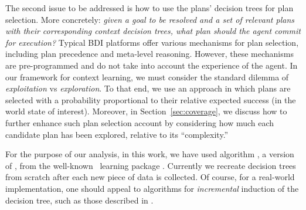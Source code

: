 The second issue to be addressed is how to use the plans' decision trees for plan
selection. More concretely: \emph{given a goal to be resolved and a set of
relevant plans with their corresponding context decision trees, what plan should
the agent commit for execution?}
Typical BDI platforms offer various mechanisms for plan selection, including plan
precedence and meta-level reasoning. However, these mechanisms are pre-programmed
and do not take into account the experience of the agent.
In our framework for context learning, we must consider the standard dilemma of
\emph{exploitation} vs \emph{exploration}. To that end, we use an 
approach in which plans are selected with a probability proportional to their relative expected
success (in the world state of interest). Moreover, in
Section~\ref{sec:coverage}, we discuss how to further enhance such plan selection
account by considering how much each candidate plan has been
explored, relative to its ``complexity.''



For the purpose of our analysis, in this work, we have used algorithm
, a version of  \cite{Mitchell97:ML}, from the
well-known \weka\ learning package \cite{weka99}. Currently we
recreate decision trees from scratch after each new piece of data is collected.
Of course, for a real-world implementation, one should appeal to algorithms for
\emph{incremental} induction of the decision tree, such as those described in
\cite{Swere06:Fast,Utgoff97Decision}.
 
%


